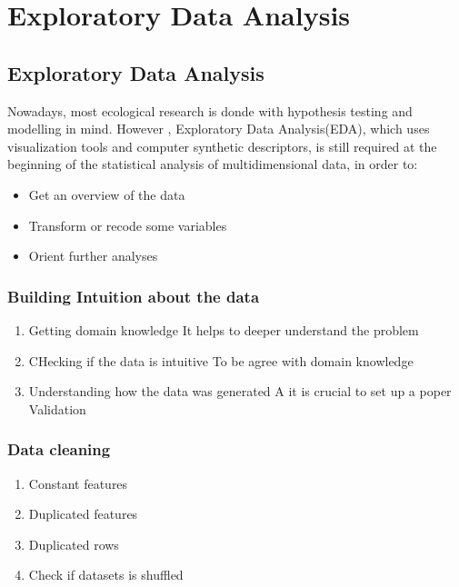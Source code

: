 \documentclass[12pt]{book}
\begin{document}
\chapter{Exploratory Data Analysis}
\section{Exploratory Data Analysis}

    Nowadays, most ecological research is donde with hypothesis testing and modelling in mind. 
    However , Exploratory Data Analysis(EDA), which uses visualization tools and computer synthetic descriptors, 
    is still required at the beginning of the statistical analysis of multidimensional data, in order to:

    \begin{itemize}
        \item Get an overview of the data
        \item Transform or recode some variables
        \item Orient further analyses
    \end{itemize}

    \subsection{Building Intuition about the data}
        \begin{enumerate}
            \item Getting domain knowledge
                It helps to deeper understand the problem
            \item CHecking if the data is intuitive
                To be agree with domain knowledge 
            \item Understanding how the data was generated
                A it is crucial to set up a poper Validation
        \end{enumerate}

    \subsection{Data cleaning}
        \begin{enumerate}
            \item Constant features
            \item Duplicated features
            \item Duplicated rows
            \item Check if datasets is shuffled
        \end{enumerate}
\end{document}

